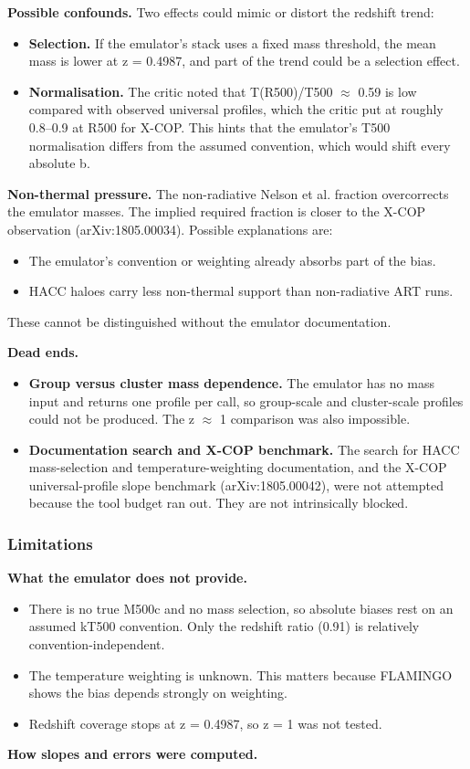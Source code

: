 \documentclass[11pt,a4paper]{article}
\begin{document}
\textbf{Possible confounds.} Two effects could mimic or distort the redshift trend:

\begin{itemize}
  \item \textbf{Selection.} If the emulator's stack uses a fixed mass threshold, the mean mass is lower at z = 0.4987, and part of the trend could be a selection effect.
  \item \textbf{Normalisation.} The critic noted that T(R500)/T500 $\approx$ 0.59 is low compared with observed universal profiles, which the critic put at roughly 0.8--0.9 at R500 for X-COP. This hints that the emulator's T500 normalisation differs from the assumed convention, which would shift every absolute b.
\end{itemize}
\textbf{Non-thermal pressure.} The non-radiative Nelson et al. fraction overcorrects the emulator masses. The implied required fraction is closer to the X-COP observation (arXiv:1805.00034). Possible explanations are:

\begin{itemize}
  \item The emulator's convention or weighting already absorbs part of the bias.
  \item HACC haloes carry less non-thermal support than non-radiative ART runs.
\end{itemize}
These cannot be distinguished without the emulator documentation.

\textbf{Dead ends.}

\begin{itemize}
  \item \textbf{Group versus cluster mass dependence.} The emulator has no mass input and returns one profile per call, so group-scale and cluster-scale profiles could not be produced. The z $\approx$ 1 comparison was also impossible.
  \item \textbf{Documentation search and X-COP benchmark.} The search for HACC mass-selection and temperature-weighting documentation, and the X-COP universal-profile slope benchmark (arXiv:1805.00042), were not attempted because the tool budget ran out. They are not intrinsically blocked.
\end{itemize}
\subsubsection*{Limitations}
\textbf{What the emulator does not provide.}

\begin{itemize}
  \item There is no true M500c and no mass selection, so absolute biases rest on an assumed kT500 convention. Only the redshift ratio (0.91) is relatively convention-independent.
  \item The temperature weighting is unknown. This matters because FLAMINGO shows the bias depends strongly on weighting.
  \item Redshift coverage stops at z = 0.4987, so z = 1 was not tested.
\end{itemize}
\textbf{How slopes and errors were computed.}
\end{document}

